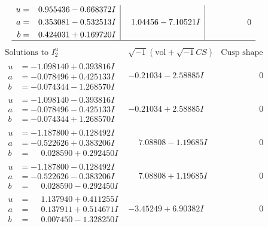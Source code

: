 \documentclass[1p]{elsarticle_modified}
\theoremstyle{definition}
\newcommand{\I}{\sqrt{-1}}
\begin{document}
$$\begin{array}{c|c|c}
\begin{aligned}
u &= \phantom{-}0.955436 - 0.668372 I \\
a &= \phantom{-}0.353081 - 0.532513 I \\
b &= \phantom{-}0.424031 + 0.169720 I\end{aligned}
 & \phantom{-}1.04456 - 7.10521 I & \phantom{-0.000000 } 0\\
 \hline 
 \end{array}$$\newpage$$\begin{array}{c|c|c}  
\text{Solutions to }I^u_{2}& \I (\text{vol} + \sqrt{-1}CS) & \text{Cusp shape}\\
 \hline 
\begin{aligned}
u &= -1.098140 + 0.393816 I \\
a &= -0.078496 + 0.425133 I \\
b &= -0.074344 - 1.268570 I\end{aligned}
 & -0.21034 - 2.58885 I & \phantom{-0.000000 } 0 \\ \hline\begin{aligned}
u &= -1.098140 - 0.393816 I \\
a &= -0.078496 - 0.425133 I \\
b &= -0.074344 + 1.268570 I\end{aligned}
 & -0.21034 + 2.58885 I & \phantom{-0.000000 } 0 \\ \hline\begin{aligned}
u &= -1.187800 + 0.128492 I \\
a &= -0.522626 + 0.383206 I \\
b &= \phantom{-}0.028590 + 0.292450 I\end{aligned}
 & \phantom{-}7.08808 - 1.19685 I & \phantom{-0.000000 } 0 \\ \hline\begin{aligned}
u &= -1.187800 - 0.128492 I \\
a &= -0.522626 - 0.383206 I \\
b &= \phantom{-}0.028590 - 0.292450 I\end{aligned}
 & \phantom{-}7.08808 + 1.19685 I & \phantom{-0.000000 } 0 \\ \hline\begin{aligned}
u &= \phantom{-}1.137940 + 0.411255 I \\
a &= \phantom{-}0.137911 + 0.514671 I \\
b &= \phantom{-}0.007450 - 1.328250 I\end{aligned}
 & -3.45249 + 6.90382 I & \phantom{-0.000000 } 0 \\ \hline\begin{aligned}

\end{aligned}
\end{array}$$
\end{document}

